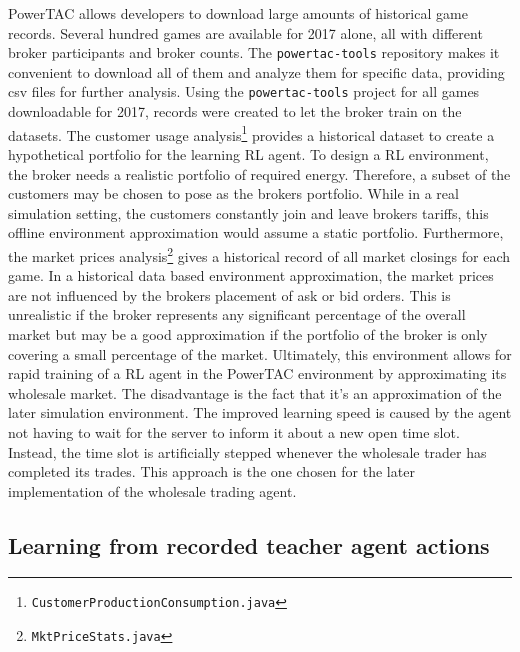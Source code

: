 \ac{PowerTAC} allows developers to download large amounts of historical game records. Several hundred games are
available for 2017 alone, all with different broker participants and broker counts. The \texttt{powertac-tools}
repository makes it convenient to download all  of them and analyze them for specific data, providing csv files for
further analysis. Using the \texttt{powertac-tools} project for all games downloadable for 2017, records were created to
let the broker train on the datasets. The customer usage analysis\footnote{\texttt{CustomerProductionConsumption.java}}
provides a historical dataset to create a hypothetical portfolio for the learning \ac{RL} agent. To design a \ac{RL}
environment, the broker needs a realistic portfolio of required energy. Therefore, a subset of the customers may be
chosen to pose as the brokers portfolio. While in a real simulation setting, the customers constantly join and leave
brokers tariffs, this offline environment approximation would assume a static portfolio. Furthermore, the market prices
analysis\footnote{\texttt{MktPriceStats.java}} gives a historical record of all market closings for each game. In a
historical data based environment approximation, the market prices are not influenced by the brokers placement of ask
or bid orders. This is unrealistic if the broker represents any significant percentage of the overall market but may be
a good approximation if the portfolio of the broker is only covering a small percentage of the market. Ultimately, this
environment allows for rapid training of a \ac{RL} agent in the \ac{PowerTAC} environment by approximating its wholesale
market. The disadvantage is the fact that it's an approximation of the later simulation environment. The improved learning speed
is caused by the agent not having to wait for the server to inform it about a new open time slot. Instead, the
time slot is artificially stepped whenever the wholesale trader has completed its trades. This approach is the one
chosen for the later implementation of the wholesale trading agent.

\subsection{Learning from recorded teacher agent actions}%
\label{ssub:learning_from_historical_actions_of_teacher_agents}

